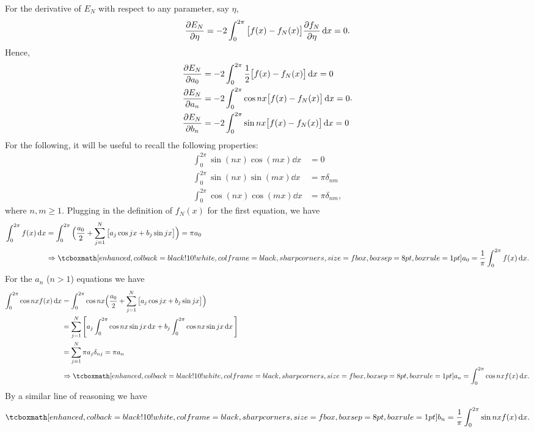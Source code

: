 For the derivative of $E_{N}$ with respect to any parameter, say $\eta$, 
\begin{eqnarray}
    \label{eq:deriv-EN-param}
    \pdv{E_{N}}{\eta} = -2\int_{0}^{2\pi} \big[ f(x) - f_{N}(x) \big] \pdv{f_{N}}{\eta} \dd{x} = 0
.\end{eqnarray}
Hence,
\begin{eqnarray}
    \label{eq:deriv-params}
    \begin{aligned}
        \pdv{E_{N}}{a_0} &= -2\int_{0}^{2\pi} \frac{1}{2}\big[f(x) - f_{N}(x) \big] \dd{x} = 0 \\
        \pdv{E_{N}}{a_n} &= -2\int_{0}^{2\pi} \cos{nx}\big[f(x) - f_{N}(x) \big] \dd{x} = 0 \\
        \pdv{E_{N}}{b_n} &= -2\int_{0}^{2\pi} \sin{nx}\big[f(x) - f_{N}(x) \big] \dd{x} = 0 \\
    \end{aligned}
.\end{eqnarray}
For the following, it will be useful to recall the following properties:
\begin{align}
    \label{eq:properties}
    \int_{0}^{2\pi} \sin{(n x)} \cos{(m x)} \dd{x} &= 0 \\
    \int_{0}^{2\pi} \sin{(n x)} \sin{(m x)} \dd{x} &= \pi\delta_{nm} \\
    \int_{0}^{2\pi} \cos{(n x)} \cos{(m x)} \dd{x} &= \pi\delta_{nm}
,\end{align}
where $n,m \geq 1$.
Plugging in the definition of $f_{N}(x)$ for the first equation, we have
\begin{align}
    \label{eq:deriv-params-1}
    \int_{0}^{2\pi} f(x) \dd{x} &= \int_{0}^{2\pi} \Big( \frac{a_0}{2} + \sum_{j=1}^{N} \big[ a_{j}\cos{jx} + b_{j} \sin{jx} \big] \Big) = \pi a_0 \\
                                &\Rightarrow \eqbox{a_0 = \frac{1}{\pi} \int_{0}^{2\pi} f(x) \dd{x}}
.\end{align}
For the $a_{n}$ ($n > 1$) equations we have
\begin{align}
    \label{eq:deriv-params-2}
    \int_{0}^{2\pi} \cos{nx}f(x) \dd{x} &= \int_{0}^{2\pi} \cos{nx}\Big( \frac{a_0}{2} + \sum_{j=1}^{N} \big[ a_{j}\cos{jx} + b_{j} \sin{jx} \big] \Big) \\
                                        &= \sum_{j=1}^{N} \Bigg[ a_{j} \int_{0}^{2\pi} \cos{nx}\sin{jx} \dd{x} + b_{j} \int_{0}^{2\pi} \cos{nx}\sin{jx} \dd{x} \Bigg] \\
                                        &= \sum_{j=1}^{N} \pi a_{j} \delta_{nj} = \pi a_{n} \\
                                        &\Rightarrow \eqbox{a_{n} = \int_{0}^{2\pi} \cos{nx} f(x) \dd{x}}
.\end{align}
By a similar line of reasoning we have
\begin{eqnarray}
    \label{eq:deriv-params-3}
    \eqbox{
        b_{n} = \frac{1}{\pi} \int_{0}^{2\pi} \sin{nx} f(x) \dd{x}
} 
.\end{eqnarray}




